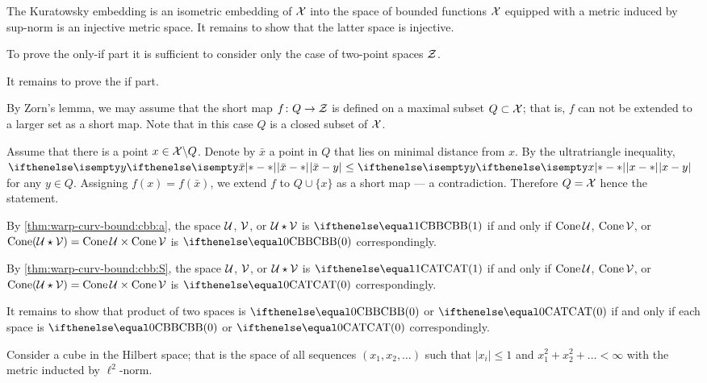 The Kuratowsky embedding is an isometric embedding of $\mathcal{X}$ into the space of bounded functions $\mathcal{X}$ equipped with a metric induced by sup-norm is an injective metric space.
It remains to show that the latter space is injective.


To prove the only-if part it is sufficient to consider only the case of two-point spaces $\mathcal{Z}$.

It remains to prove the if part.

By Zorn's lemma, we may assume that the short map $f\:Q\to \spc{Z}$ is defined on a maximal subset $Q\subset \spc{X}$;
that is, $f$ can not be extended to a larger set as a short map.
Note that in this case $Q$ is a closed subset of $\mathcal{X}$.

Assume that there is a point $x\in \spc{X}\backslash Q$.
Denote by $\bar x$ a point in $Q$ that lies on minimal distance from $x$.
By the ultratriangle inequality, $\dist{\bar x}{y}{}\le\dist{x}{y}{}$ for any $y\in Q$.
Assigning $f(x)=f(\bar x)$, we extend $f$ to $Q\cup\{x\}$ as a short map --- a contradiction.
Therefore $Q=\mathcal{X}$ hence the statement.




By \ref{thm:warp-curv-bound:cbb:a}, the space $\mathcal{U}$, $\mathcal{V}$, or $\mathcal{U}\star\mathcal{V}$ is $\Alex1$ if and only if $\mathop{\rm Cone}\nolimits\mathcal{U}$, $\mathop{\rm Cone}\nolimits\mathcal{V}$, or $\Cone(\spc{U}\star\spc{V})=\Cone\spc{U}\times\Cone\spc{V}$ is $\Alex0$ correspondingly.

By \ref{thm:warp-curv-bound:cbb:S}, the space $\mathcal{U}$, $\mathcal{V}$, or $\mathcal{U}\star\mathcal{V}$ is $\CAT1$ if and only if $\mathop{\rm Cone}\nolimits\mathcal{U}$, $\mathop{\rm Cone}\nolimits\mathcal{V}$, or $\Cone(\spc{U}\star\spc{V})=\Cone\spc{U}\times\Cone\spc{V}$ is $\CAT0$ correspondingly.

It remains to show that product of two spaces is $\Alex0$ or $\CAT0$ if and only if each space is $\Alex0$ or $\CAT0$ correspondingly.

Consider a cube in the Hilbert space;
that is the space of all sequences $(x_1,x_2,\dots)$ such that $|x_i|\le 1$ and $x_1^2+x_2^2+\dots<\infty$ with the metric inducted by $\ell^2$-norm.



